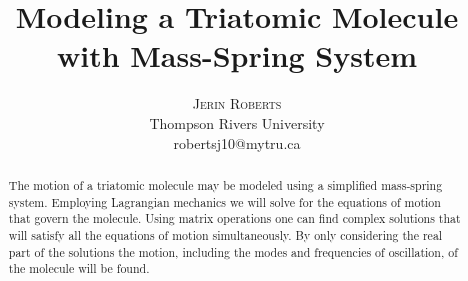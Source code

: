 \documentclass[hidelinks]{article}
\title{\vspace{-15mm}\fontsize{15pt}{10pt}\selectfont\textbf{Modeling a Triatomic Molecule with Mass-Spring System}} %
\author{
\large
\textsc{Jerin Roberts}\\[2mm] %
\normalsize Thompson Rivers University \\ %
\normalsize {robertsj10@mytru.ca} %
\vspace{-5mm}
}
\date{}
\begin{document}
\maketitle %

\thispagestyle{fancy} %


\begin{abstract}

The motion of a triatomic molecule may be modeled using a simplified mass-spring system. Employing Lagrangian mechanics we will solve for the equations of motion that govern the molecule. Using matrix operations one can find complex solutions that will satisfy all the equations of motion simultaneously. By only considering the real part of the solutions the motion, including the modes and frequencies of oscillation, of the molecule will be found.

\end{abstract}

\end{document}
